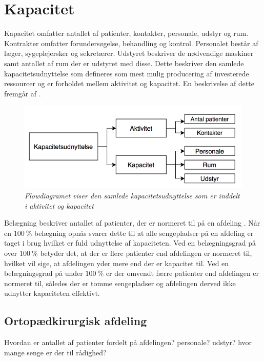 \section{Kapacitet}
Kapacitet omfatter antallet af patienter, kontakter, personale, udstyr og rum. Kontrakter omfatter forundersøgelse, behandling og kontrol. Personalet består af læger, sygeplejersker og sekretærer. Udstyret beskriver de nødvendige maskiner samt antallet af rum der er udstyret med disse. Dette beskriver den samlede kapacitetsudnyttelse som defineres som  mest mulig producering af investerede ressourcer og er forholdet mellem aktivitet og kapacitet. \cite{Company2013} En beskrivelse af dette fremgår af . 

\begin{figure}[H]
	\flushleft 
	\centering
	\includegraphics[scale=.45]{figures/Kapacitetsudnyttelse.png}
	\label{kapacitet}
	\flushleft
	\textit{Flowdiagramet viser den samlede kapacitetsudnyttelse som er inddelt i aktivitet og kapacitet \cite{Company2013}}
\end{figure}


\noindent
Belægning beskriver antallet af patienter, der er normeret til på en afdeling \cite{Heidmann2014}. Når en $100~\%$ belægning opnås svarer dette til at alle sengepladser på en afdeling er taget i brug hvilket er fuld udnyttelse af kapaciteten. Ved en belægningsgrad på over $100~\%$ betyder det, at der er flere patienter end afdelingen er normeret til, hvilket vil sige, at afdelingen yder mere end der er kapacitet til. Ved en belægningsgrad på under $100~\%$ er der omvendt færre patienter end afdelingen er normeret til, således der er tomme sengepladser og afdelingen derved ikke udnytter kapaciteten effektivt. \cite{Pauly1986} 

\subsection{Ortopædkirurgisk afdeling}
Hvordan er antallet af patienter fordelt på afdelingen? personale? udstyr? hvor mange senge er der til rådighed?


